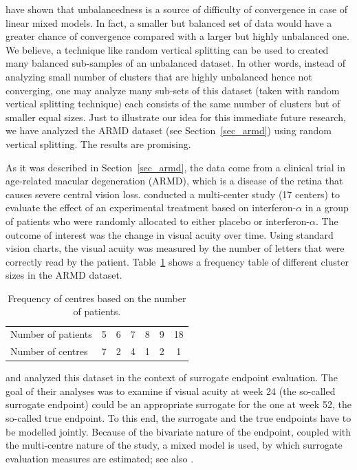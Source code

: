 \documentclass[11pt,a5paper,twoside]{book}
\begin{document}
\cite{wim2015} have shown that unbalancedness is a source of difficulty of convergence in case of linear mixed models. In fact, a smaller but balanced set of data would have a greater chance of convergence compared with a larger but highly unbalanced one. We believe, a technique like random vertical splitting can be used to created many balanced sub-samples of an unbalanced dataset. In other words, instead of analyzing small number of clusters that are highly unbalanced hence not converging, one may analyze many sub-sets of this dataset (taken with random vertical splitting technique) each consists of the same number of clusters but of smaller equal sizes. Just to illustrate our idea for this immediate future research, we have analyzed the ARMD dataset (see Section~\ref{sec_armd}) using random vertical splitting. The results are promising.

As it was described in Section~\ref{sec_armd}, the data come from a clinical trial in age-related macular degeneration (ARMD), which is a disease of the retina that causes severe central vision loss. \cite{pharmacological1997} conducted a multi-center study (17 centers) to evaluate the effect of an experimental treatment based on interferon-$\alpha$ in a group of patients who were randomly allocated to either placebo or interferon-$\alpha$. The outcome of interest was the change in visual acuity over time. Using standard vision charts, the visual acuity was measured by the number of letters that were correctly read by the patient. Table~\ref{tab_freq} shows a frequency table of different cluster sizes in the ARMD dataset. 

\begin{table}[t]
\centering
\caption{Frequency of centres based on the number of patients.}
\label{tab_freq}

\vspace*{2mm}

\begin{tabular}{lcccccc}
  \hline\hline
Number of patients & 5 & 6 & 7 & 8 & 9 & 18 \\ 
Number of centres &   7 &   2 &   4 &   1 &   2 &   1 \\ 
   \hline\hline
\end{tabular}
\end{table}

\cite{burzykowski2006} and \cite{alonso2015} analyzed this dataset in the context of surrogate endpoint evaluation. The goal of their analyses was to examine if visual acuity at week 24 (the so-called surrogate endpoint) could be an appropriate surrogate for the one at week 52, the so-called true endpoint. To this end, the surrogate and the true endpoints have to be modelled jointly.
Because of the bivariate nature of the endpoint, coupled with the multi-centre nature of the study, a mixed model is used, by which surrogate evaluation measures are estimated; see also \cite{buyse2000}. 
\end{document}
